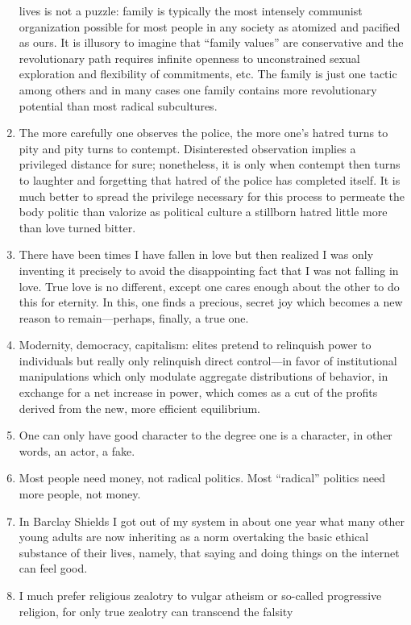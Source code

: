 \documentclass[a4paper,12pt,margin=.5in]{article}
\begin{document}
\begin{enumerate}
  lives is not a puzzle: family is typically the most intensely
  communist organization possible for most people in any society as
  atomized and pacified as ours. It is illusory to imagine that ``family
  values'' are conservative and the revolutionary path requires infinite
  openness to unconstrained sexual exploration and flexibility of
  commitments, etc. The family is just one tactic among others and in
  many cases one family contains more revolutionary potential than most
  radical subcultures.
\item
  The more carefully one observes the police, the more one's hatred
  turns to pity and pity turns to contempt. Disinterested observation
  implies a privileged distance for sure; nonetheless, it is only when
  contempt then turns to laughter and forgetting that hatred of the
  police has completed itself. It is much better to spread the privilege
  necessary for this process to permeate the body politic than valorize
  as political culture a stillborn hatred little more than love turned
  bitter.
\item
  There have been times I have fallen in love but then realized I was
  only inventing it precisely to avoid the disappointing fact that I was
  not falling in love. True love is no different, except one cares
  enough about the other to do this for eternity. In this, one finds a
  precious, secret joy which becomes a new reason to remain---perhaps,
  finally, a true one.
\item
  Modernity, democracy, capitalism: elites pretend to relinquish power
  to individuals but really only relinquish direct control---in favor of
  institutional manipulations which only modulate aggregate
  distributions of behavior, in exchange for a net increase in power,
  which comes as a cut of the profits derived from the new, more
  efficient equilibrium.
\item
  One can only have good character to the degree one is a character, in
  other words, an actor, a fake.
\item
  Most people need money, not radical politics. Most ``radical''
  politics need more people, not money.
\item
  In Barclay Shields I got out of my system in about one year what many
  other young adults are now inheriting as a norm overtaking the basic
  ethical substance of their lives, namely, that saying and doing things
  on the internet can feel good.
\item
  I much prefer religious zealotry to vulgar atheism or so-called
  progressive religion, for only true zealotry can transcend the falsity

\end{enumerate}
\end{document}
